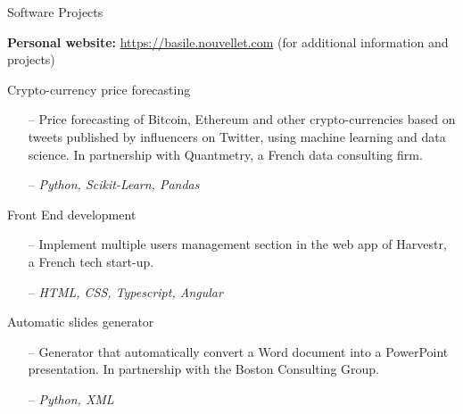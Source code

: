 \documentclass[]{mcdowellcv}
\begin{document}
    \begin{cvsection}{Software Projects}

        \hspace{4pt} \textbf{Personal website:} {\small \color{blue} \url{https://basile.nouvellet.com}} ({\small for additional information and projects})

        \begin{cvsubsection}{Crypto-currency price forecasting}{}{}
            \begin{itemize}
                \item[--] Price forecasting of Bitcoin, Ethereum and other crypto-currencies based on tweets published by influencers on Twitter, using machine learning and data science. In partnership with Quantmetry, a French data consulting firm.
                \item[--] \textit{Python, Scikit-Learn, Pandas}
            \end{itemize}
        \end{cvsubsection}

        \begin{cvsubsection}{Front End development}{}{}
            \begin{itemize}
                \item[--] Implement multiple users management section in the web app of Harvestr, a French tech start-up.
                \item[--] \textit{HTML, CSS, Typescript, Angular}
            \end{itemize}
        \end{cvsubsection}

        \begin{cvsubsection}{Automatic slides generator}{}{}
            \begin{itemize}
                \item[--] Generator that automatically convert a Word document into a PowerPoint presentation. In partnership with the Boston Consulting Group.
                \item[--] \textit{Python, XML}
            \end{itemize}
        \end{cvsubsection}

    \end{cvsection}
\end{document}
